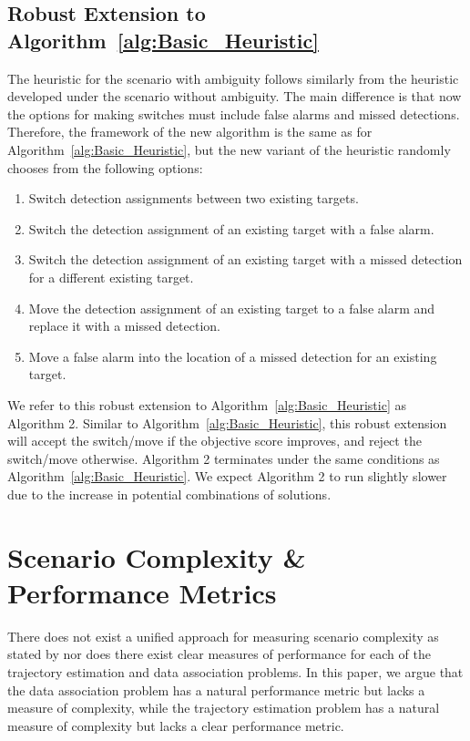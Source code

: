 \documentclass[journal]{IEEEtran}
\begin{document}
\subsection{Robust Extension to Algorithm~\ref{alg:Basic_Heuristic}}
The heuristic for the scenario with ambiguity follows similarly from the heuristic developed under the scenario without ambiguity. The main difference is that now the options for making switches must include false alarms and missed detections. Therefore, the framework of the new algorithm is the same as for Algorithm~\ref{alg:Basic_Heuristic}, but the new variant of the heuristic randomly chooses from the following options: 
\begin{enumerate}
  \item Switch detection assignments between two existing targets.
  \item Switch the detection assignment of an existing target with a false alarm.
  \item Switch the detection assignment of an existing target with a missed detection for a different existing target.
  \item Move the detection assignment of an existing target to a false alarm and replace it with a missed detection.
  \item Move a false alarm into the location of a missed detection for an existing target.
\end{enumerate}

We refer to this robust extension to Algorithm~\ref{alg:Basic_Heuristic} as Algorithm 2. Similar to Algorithm~\ref{alg:Basic_Heuristic}, this robust extension will accept the switch/move if the objective score improves, and reject the switch/move otherwise. Algorithm 2 terminates under the same conditions as Algorithm~\ref{alg:Basic_Heuristic}. We expect Algorithm 2 to run slightly slower due to the increase in potential combinations of solutions. 

\section{Scenario Complexity \& Performance Metrics} \label{sec:Scenario-Performance}
There does not exist a unified approach for measuring scenario complexity as stated by \cite{MTT-Taxonomy} nor does there exist clear measures of performance for each of the trajectory estimation and data association problems. In this paper, we argue that the data association problem has a natural performance metric but lacks a measure of complexity, while the trajectory estimation problem has a natural measure of complexity but lacks a clear performance metric. 
\end{document}
